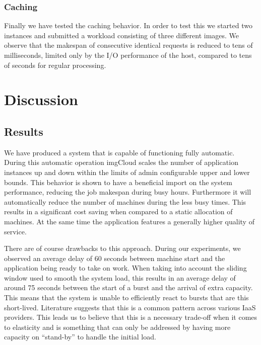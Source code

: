 \documentclass[conference]{IEEEtran}
\begin{document}
\subsubsection{Caching}
Finally we have tested the caching behavior. In order to test this we started two instances and submitted a workload consisting of three different images. We observe that the makespan of consecutive identical requests is reduced to tens of milliseconds, limited only by the I/O performance of the host, compared to tens of seconds for regular processing. 

\section{Discussion}

\subsection{Results}
We have produced a system that is capable of functioning fully automatic. During this automatic operation imgCloud scales the number of application instances up and down within the limits of admin configurable upper and lower bounds. This behavior is shown to have a beneficial import on the system performance, reducing the job makespan during busy hours. Furthermore it will automatically reduce the number of machines during the less busy times. This results in a significant cost saving when compared to a static allocation of machines. At the same time the application features a generally higher quality of service.

There are of course drawbacks to this approach. During our experiments, we observed an average delay of 60 seconds between machine start and the application being ready to take on work. When taking into account the sliding window used to smooth the system load, this results in an average delay of around 75 seconds between the start of a burst and the arrival of extra capacity. This means that the system is unable to efficiently react to bursts that are this short-lived. Literature suggests that this is a common pattern across various IaaS providers.\cite{mao-vm-startup-time} This leads us to believe that this is a necessary trade-off when it comes to elasticity and is something that can only be addressed by having more capacity on ``stand-by'' to handle the initial load. 
\end{document}
